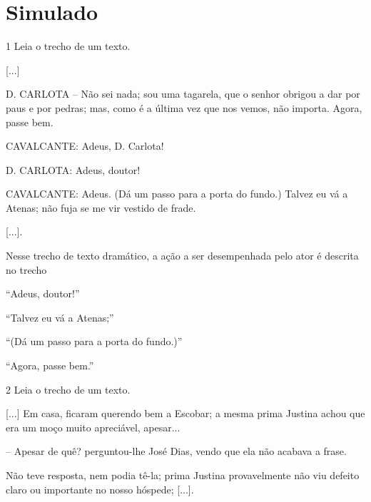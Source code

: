 \chapter[Simulado 2]{Simulado}

\vspace*{-.5cm}

\num{1} Leia o trecho de um texto.

\begin{myquote}
{[}...{]}

D. CARLOTA – Não sei nada; sou uma tagarela, que o senhor obrigou a
dar por paus e por pedras; mas, como é a última vez que nos vemos, não
importa. Agora, passe bem.

CAVALCANTE: Adeus, D. Carlota!

D. CARLOTA: Adeus, doutor!

CAVALCANTE: Adeus. (Dá um passo para a porta do fundo.) Talvez eu vá a
Atenas; não fuja se me vir vestido de frade.

{[}...{]}.

\end{myquote}

Nesse trecho de texto dramático, a ação a ser desempenhada pelo ator é descrita
no trecho

\begin{escolha}
\item “Adeus, doutor!”

\item “Talvez eu vá a Atenas;”

\item “(Dá um passo para a porta do fundo.)”

\item “Agora, passe bem.”
\end{escolha}


\num{2} Leia o trecho de um texto.

\begin{myquote}
{[}...{]} Em casa, ficaram querendo bem a Escobar; a mesma prima
Justina achou que era um moço muito apreciável, apesar...

– Apesar de quê? perguntou-lhe José Dias, vendo que ela não acabava a frase.

Não teve resposta, nem podia tê-la; prima Justina provavelmente não viu
defeito claro ou importante no nosso hóspede; {[}...{]}.

\end{myquote}

